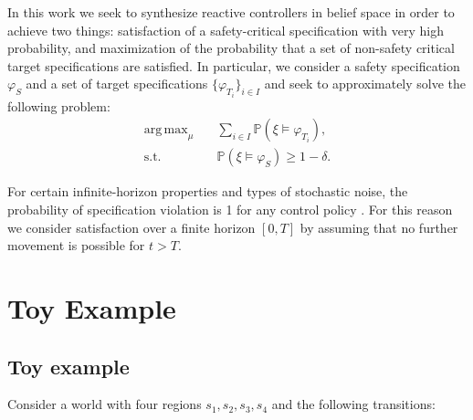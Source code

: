 \documentclass[conference]{IEEEtran}
\DeclareMathOperator*{\argmax}{arg\,max}
\begin{document}
In this work we seek to synthesize reactive controllers in belief space in order to achieve two things: satisfaction of a safety-critical specification with very high probability, and maximization of the probability that a set of non-safety critical target specifications are satisfied. In particular, we consider a safety specification $\varphi_S$ and a set of target specifications $\{ \varphi_{T_i} \}_{i \in I}$ and seek to approximately solve the following problem:
\begin{equation}
\begin{aligned}
  \argmax_{\mu} & \quad  \sum_{i \in I} \mathbb{P} \left( \xi \models \varphi_{T_i} \right), \\ 
  \text{s.t.} &\quad   \mathbb{P} \left( \xi \models \varphi_S \right) \geq 1 - \delta.
\end{aligned}
\end{equation}


For certain infinite-horizon properties and types of stochastic noise, the probability of specification violation is 1 for any control policy \cite{Ehlers2016}. For this reason we consider satisfaction over a finite horizon $[0, T]$ by assuming that no further movement is possible for $t > T$.


\section{Toy Example}

\subsection{Toy example}

Consider a world with four regions $s_1, s_2, s_3, s_4$ and the following transitions:

\begin{center}
\end{center}
\end{document}
